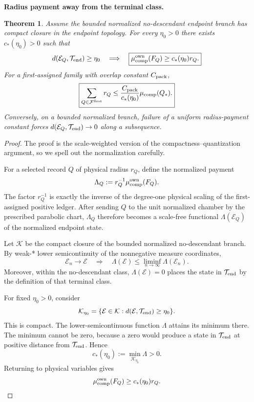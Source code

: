 \documentclass[11pt]{article}
\newtheorem{theorem}{Theorem}[section]
\theoremstyle{definition}\newtheorem{problem}[theorem]{Problem}
\theoremstyle{definition}
\theoremstyle{remark}
\begin{document}
\medskip
\noindent\textbf{Radius payment away from the terminal class.}
\begin{theorem}\label{thm:radius-payment}
Assume the bounded normalized no-descendant endpoint branch has compact closure
in the endpoint topology.  For every $\eta_0>0$ there exists $c_*(\eta_0)>0$ such that
\[
d(\mathcal E_Q,\mathcal T_{\rm end})\ge\eta_0
\quad\Longrightarrow\quad
\boxed{\mu_{\rm comp}^{\rm own}(F_Q)\ge c_*(\eta_0)r_Q.}
\]
For a first-assigned family with overlap constant $C_{\rm pack}$,
\[
\boxed{
\sum_{Q\in\mathcal F^{\rm first}}r_Q
\le \frac{C_{\rm pack}}{c_*(\eta_0)}\mu_{\rm comp}(Q_*).}
\]
Conversely, on a bounded normalized branch, failure of a uniform radius-payment constant forces $d(\mathcal E_Q,\mathcal T_{\rm end})\to0$ along a subsequence.
\end{theorem}
\begin{proof}
The proof is the scale-weighted version of the compactness--quantization
argument, so we spell out the normalization carefully.

For a selected record \(Q\) of physical radius \(r_Q\), define the normalized
payment
\[
 \Lambda_Q:=r_Q^{-1}\mu_{\rm comp}^{\rm own}(F_Q).
\]
The factor \(r_Q^{-1}\) is exactly the inverse of the degree-one physical
scaling of the first-assigned positive ledger.  After sending \(Q\) to the
unit normalized chamber by the prescribed parabolic chart, \(\Lambda_Q\)
therefore becomes a scale-free functional \(\Lambda(\mathcal E_Q)\) of the
normalized endpoint state.

Let \(\mathcal K\) be the compact closure of the bounded normalized
no-descendant branch.  By weak-* lower semicontinuity of the nonnegative
measure coordinates,
\[
 \mathcal E_n\to\mathcal E
 \quad\Longrightarrow\quad
 \Lambda(\mathcal E)
 \le\liminf_{n\to\infty}\Lambda(\mathcal E_n).
\]
Moreover, within the no-descendant class,
\(\Lambda(\mathcal E)=0\) places the state in \(\mathcal T_{\rm end}\) by the
definition of that terminal class.

For fixed \(\eta_0>0\), consider
\[
 \mathcal K_{\eta_0}
 =\{\mathcal E\in\mathcal K:
 d(\mathcal E,\mathcal T_{\rm end})\ge\eta_0\}.
\]
This is compact.  The lower-semicontinuous function \(\Lambda\) attains its
minimum there.  The minimum cannot be zero, because a zero would produce a
state in \(\mathcal T_{\rm end}\) at positive distance from
\(\mathcal T_{\rm end}\).  Hence
\[
 c_*(\eta_0):=\min_{\mathcal K_{\eta_0}}\Lambda>0.
\]
Returning to physical variables gives
\[
 \mu_{\rm comp}^{\rm own}(F_Q)
 \ge c_*(\eta_0)r_Q.
\]


\end{proof}
\end{document}
